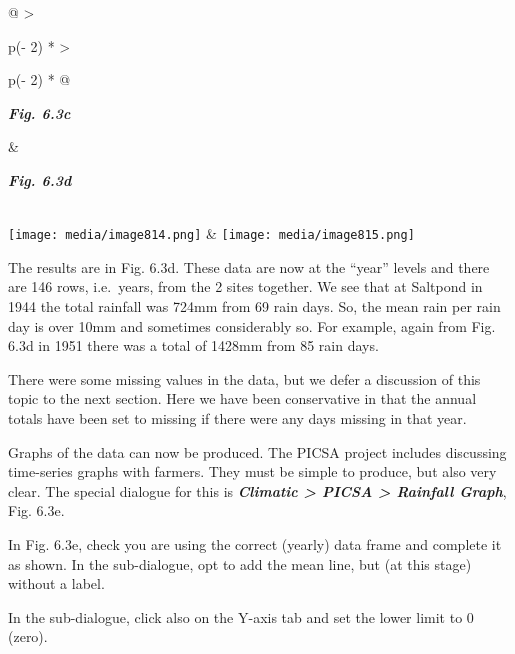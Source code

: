\documentclass[
  letterpaper,
  DIV=11,
  numbers=noendperiod]{scrreprt}
\begin{document}
\begin{longtable}[]{@{}
  >{\raggedright\arraybackslash}p{(\columnwidth - 2\tabcolsep) * }
  >{\raggedright\arraybackslash}p{(\columnwidth - 2\tabcolsep) * }@{}}
\toprule\noalign{}
\begin{minipage}[b]{\linewidth}\raggedright
\textbf{\emph{Fig. 6.3c}}
\end{minipage} & \begin{minipage}[b]{\linewidth}\raggedright
\textbf{\emph{Fig. 6.3d}}
\end{minipage} \\
\midrule\noalign{}
\endhead
\bottomrule\noalign{}
\endlastfoot
\texttt{[image: media/image814.png]} &
\texttt{[image: media/image815.png]} \\
\end{longtable}

The results are in Fig. 6.3d. These data are now at the ``year'' levels
and there are 146 rows, i.e.~years, from the 2 sites together. We see
that at Saltpond in 1944 the total rainfall was 724mm from 69 rain days.
So, the mean rain per rain day is over 10mm and sometimes considerably
so. For example, again from Fig. 6.3d in 1951 there was a total of
1428mm from 85 rain days.

There were some missing values in the data, but we defer a discussion of
this topic to the next section. Here we have been conservative in that
the annual totals have been set to missing if there were any days
missing in that year.

Graphs of the data can now be produced. The PICSA project includes
discussing time-series graphs with farmers. They must be simple to
produce, but also very clear. The special dialogue for this is
\textbf{\emph{Climatic \textgreater{} PICSA \textgreater{} Rainfall
Graph}}, Fig. 6.3e.

In Fig. 6.3e, check you are using the correct (yearly) data frame and
complete it as shown. In the sub-dialogue, opt to add the mean line, but
(at this stage) without a label.

In the sub-dialogue, click also on the Y-axis tab and set the lower
limit to 0 (zero).
\end{document}
